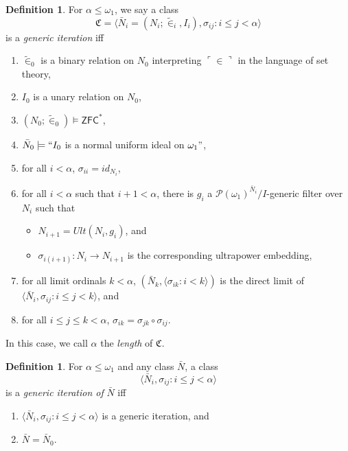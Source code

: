 \documentclass[12pt, twoside]{memoir}
\numberwithin{equation}{section}
\theoremstyle{definition}
\newtheorem{defi}[thm]{Definition}
\theoremstyle{remark}
\theoremstyle{definition}
\theoremstyle{definition}
\theoremstyle{definition}
\theoremstyle{remark}
\begin{document}
\begin{defi}\label{def257}
For $\alpha \leq \omega_1$, we say a class $$\mathfrak{C} = \langle \bar{N}_i = (N_i; \tilde{\in}_i, I_i), \sigma_{ij} : i \leq j < \alpha \rangle$$ is a \emph{generic iteration} iff 
\begin{enumerate}[label=(\alph*)]
    \item $\tilde{\in}_0$ is a binary relation on $N_0$ interpreting $\ulcorner \in \urcorner$ in the language of set theory,
    \item $I_0$ is a unary relation on $N_0$,
    \item $(N_0; \tilde{\in}_0) \models \mathsf{ZFC}^*$,
    \item $\bar{N}_0 \models ``I_0$ is a normal uniform ideal on $\omega_1"$, 
    \item for all $i < \alpha$, $\sigma_{ii} = id_{N_i}$,
    \item for all $i < \alpha$ such that $i + 1 < \alpha$, there is $g_{i}$ a $\mathcal{P}(\omega_1)^{\bar{N}_{i}} / I$-generic filter over $N_{i}$ such that 
    \begin{itemize}[label=$\circ$]
        \item $N_{i + 1} = Ult(N_{i}, g_{i})$, and
        \item $\sigma_{i(i + 1)} : N_{i} \longrightarrow N_{i + 1}$ is the corresponding ultrapower embedding,
    \end{itemize}
    \item for all limit ordinals $k < \alpha$, $(\bar{N}_{k}, \langle \sigma_{ik} : i < k \rangle)$ is the direct limit of $\langle \bar{N}_i, \sigma_{ij} : i \leq j < k \rangle$, and
    \item for all $i \leq j \leq k < \alpha$, $\sigma_{ik} = \sigma_{jk} \circ \sigma_{ij}$.
\end{enumerate}
In this case, we call $\alpha$ the \emph{length} of $\mathfrak{C}$.
\end{defi}

\begin{defi}
For $\alpha \leq \omega_1$ and any class $\bar{N}$, a class $$\langle \bar{N}_i, \sigma_{ij} : i \leq j < \alpha \rangle$$ is a \emph{generic iteration of} $\bar{N}$ iff 
\begin{enumerate}[label=(\alph*)]
    \item $\langle \bar{N}_i, \sigma_{ij} : i \leq j < \alpha \rangle$ is a generic iteration, and
    \item $\bar{N} = \bar{N}_0$.
\end{enumerate}
\end{defi}
\end{document}
